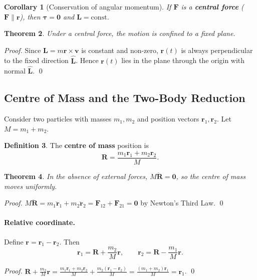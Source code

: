 \documentclass[12pt,a4paper]{article}
\theoremstyle{plain}
\newtheorem{theorem}{Theorem}[section]
\newtheorem{corollary}[theorem]{Corollary}
\theoremstyle{definition}
\newtheorem{definition}[theorem]{Definition}
\theoremstyle{remark}
\newcommand{\ve}[1]{\mathbf{#1}}           %
\newcommand{\Lv}{\ve{L}}
\newcommand{\Fv}{\ve{F}}
\newcommand{\rv}{\ve{r}}
\newcommand{\vv}{\ve{v}}
\newcommand{\Rv}{\ve{R}}
\begin{document}
\begin{corollary}[Conservation of angular momentum]
If $\Fv$ is a \textbf{central force} ($\Fv\parallel\rv$), then $\boldsymbol\tau=\ve{0}$ and $\Lv=\mathrm{const}$.
\end{corollary}

\begin{theorem}\label{thm:planar}
Under a central force, the motion is confined to a fixed plane.
\end{theorem}
\begin{proof}
Since $\Lv = m\rv\times\vv$ is constant and non-zero, $\rv(t)$ is always perpendicular to the fixed direction $\hat{\Lv}$. Hence $\rv(t)$ lies in the plane through the origin with normal $\hat{\Lv}$. \qed
\end{proof}

\subsection{Centre of Mass and the Two-Body Reduction}

Consider two particles with masses $m_1,m_2$ and position vectors $\rv_1,\rv_2$. Let $M = m_1+m_2$.

\begin{definition}
The \textbf{centre of mass} position is
\[
  \Rv = \frac{m_1\rv_1 + m_2\rv_2}{M}.
\]
\end{definition}

\begin{theorem}\label{thm:CoM}
In the absence of external forces, $M\ddot{\Rv}=\ve{0}$, so the centre of mass moves uniformly.
\end{theorem}
\begin{proof}
$M\ddot{\Rv} = m_1\ddot{\rv}_1 + m_2\ddot{\rv}_2 = \ve{F}_{12}+\ve{F}_{21} = \ve{0}$ by Newton's Third Law. \qed
\end{proof}

\paragraph{Relative coordinate.} Define $\rv = \rv_1 - \rv_2$. Then
\[
  \rv_1 = \Rv + \frac{m_2}{M}\rv,
  \qquad
  \rv_2 = \Rv - \frac{m_1}{M}\rv.
\]
\begin{proof}
$\Rv + \frac{m_2}{M}\rv = \frac{m_1\rv_1+m_2\rv_2}{M}+\frac{m_2(\rv_1-\rv_2)}{M} = \frac{(m_1+m_2)\rv_1}{M} = \rv_1$. \qed
\end{proof}
\end{document}
